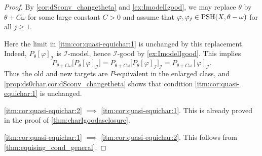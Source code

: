 \begin{proof}
    By \cref{cor:dSconv_changetheta} and \cref{ex:ImodelIgood}, we may replace $\theta$ by $\theta+C\omega$ for some large constant $C>0$ and assume that $\varphi,\varphi_j\in \mathrm{PSH}(X,\theta-\omega)$ for all $j\geq 1$.

    Here the limit in \ref{itm:cor:quasi-equichar:1} is unchanged by this replacement. Indeed, $P_{\theta}[\varphi]_{\mathcal I}$ is $\mathcal I$-model, hence $\mathcal I$-good by \cref{ex:ImodelIgood}. This implies
\[
    P_{\theta+C\omega}\bigl[P_{\theta}[\varphi]_{\mathcal I}\bigr]=P_{\theta+C\omega}\bigl[P_{\theta}[\varphi]_{\mathcal I}\bigr]_{\mathcal I}=P_{\theta+C\omega}[\varphi]_{\mathcal I}.
\]
Thus the old and new targets are $P$-equivalent in the enlarged class, and \cref{prop:ds0char,cor:dSconv_changetheta} shows that condition \ref{itm:cor:quasi-equichar:1} is
unchanged.

    \ref{itm:cor:quasi-equichar:2} $\implies$ \ref{itm:cor:quasi-equichar:1}. This is already proved in the proof of \cref{thm:charIgoodasclosure}.

    \ref{itm:cor:quasi-equichar:1} $\implies$ \ref{itm:cor:quasi-equichar:2}. This follows from \cref{thm:equising_cond_general}.
\end{proof}


